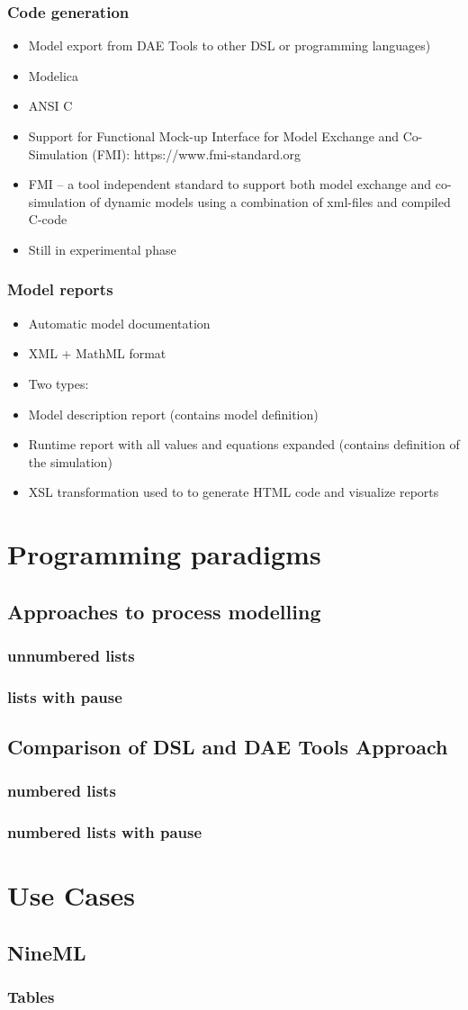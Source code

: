 \documentclass{beamer}
\begin{document}
\begin{frame}
\frametitle{Code generation}
\begin{itemize}
  \item Model export from DAE Tools to other DSL or programming languages)
  \item Modelica
  \item ANSI C
  \item Support for Functional Mock-up Interface for Model Exchange and Co-Simulation (FMI): https://www.fmi-standard.org 
  \item FMI – a tool independent standard to support both model exchange and co-simulation of dynamic models using a combination of xml-files and compiled C-code
  \item Still in experimental phase
\end{itemize}
\end{frame}

\begin{frame}
\frametitle{Model reports}
\begin{itemize}
  \item Automatic model documentation
  \item XML + MathML format
  \item Two types:
  \item Model description report (contains model definition)
  \item Runtime report with all values and equations expanded (contains definition of the simulation)
  \item XSL transformation used to to generate HTML code and visualize reports 
\end{itemize}
\end{frame}



\section{Programming paradigms}
\subsection{Approaches to process modelling}
\begin{frame}\frametitle{unnumbered lists}
\end{frame}

\begin{frame}\frametitle{lists with pause}
\end{frame}

\subsection{Comparison of DSL and DAE Tools Approach}
\begin{frame}\frametitle{numbered lists}
\end{frame}

\begin{frame}\frametitle{numbered lists with pause}
\end{frame}

\section{Use Cases} 
\subsection{NineML}
\begin{frame}\frametitle{Tables}
\end{frame}
\end{document}
